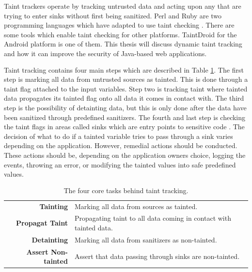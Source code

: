Taint trackers operate by tracking untrusted data and acting upon any that are trying to enter sinks without first being sanitized. Perl and Ruby are two programming languages which have adapted to use taint checking \parencite{perl, ruby}. There are some tools which enable taint checking for other platforms. TaintDroid \parencite{Ma2010} for the Android platform is one of them. This thesis will discuss dynamic taint tracking and how it can improve the security of Java-based web applications.

Taint tracking contains four main steps which are described in Table \ref{table:taintTracking}. The first step is marking all data from untrusted sources as tainted. This is done through a taint flag attached to the input variables. Step two is tracking taint where tainted data propagates its tainted flag onto all data it comes in contact with. The third step is the possibility of detainting data, but this is only done after the data have been sanitized through predefined sanitizers. The fourth and last step is checking the taint flags in areas called sinks which are entry points to sensitive code \parencite{Pan2015, Venkataramani2008}. The decision of what to do if a tainted variable tries to pass through a sink varies depending on the application. However, remedial actions should be conducted. These actions should be, depending on the application owners choice, logging the events, throwing an error, or modifying the tainted values into safe predefined values. 

\begin{table}[H]
  \centering
  \caption{The four core tasks behind taint tracking.}
  \label{table:taintTracking}
  \begin{tabular}{rp{8.5cm}}
    \textbf{Tainting}           & Marking all data from sources as tainted.                          \\
    \textbf{Propagat Taint}     & Propagating taint to all data coming in contact with tainted data. \\
    \textbf{Detainting}         & Marking all data from sanitizers as non-tainted.                   \\
    \textbf{Assert Non-tainted} & Assert that data passing through sinks are non-tainted.           
  \end{tabular}
\end{table}

